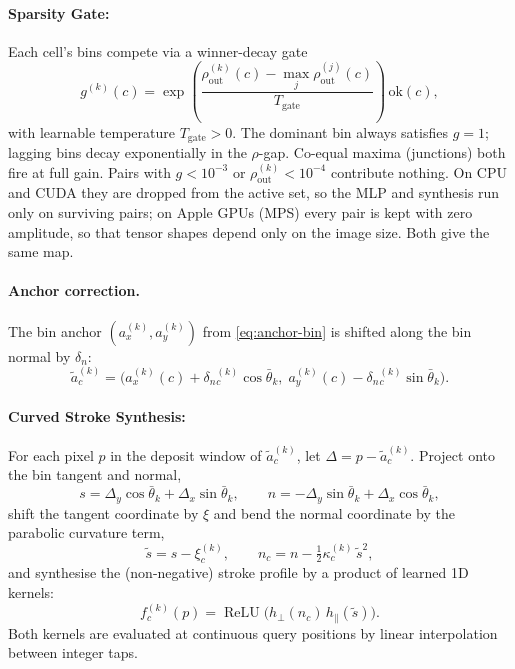 \documentclass[11pt,a4paper]{article}
\newcommand{\relu}{\operatorname{ReLU}}
\begin{document}
\paragraph{Sparsity Gate:}
Each cell's bins compete via a winner-decay gate
\begin{equation}\label{eq:gate}
  g^{(k)}(c) = \exp\!\left(\frac{\rho_{\mathrm{out}}^{(k)}(c) - \max_j \rho_{\mathrm{out}}^{(j)}(c)}{T_{\mathrm{gate}}}\right)\, \mathrm{ok}(c),
\end{equation}
with learnable temperature $T_{\mathrm{gate}} > 0$. The dominant bin always satisfies $g = 1$; lagging bins decay exponentially in the $\rho$-gap. Co-equal maxima (junctions) both fire at full gain. Pairs with $g < 10^{-3}$ or $\rho_{\mathrm{out}}^{(k)} < 10^{-4}$ contribute nothing. On CPU and CUDA they are dropped from the active set, so the MLP and synthesis run only on surviving pairs; on Apple GPUs (MPS) every pair is kept with zero amplitude, so that tensor shapes depend only on the image size. Both give the same map.

\paragraph{Anchor correction.}
The bin anchor $(a_x^{(k)}, a_y^{(k)})$ from \cref{eq:anchor-bin} is shifted along the bin normal by $\delta_n$:
\begin{equation}\label{eq:anchor-shift}
  \tilde a^{(k)}_c = \bigl(a_x^{(k)}(c) + \delta_{n}{}^{(k)}_c \cos\bar\theta_k,\;
                            a_y^{(k)}(c) - \delta_{n}{}^{(k)}_c \sin\bar\theta_k\bigr).
\end{equation}

\paragraph{Curved Stroke Synthesis:}
For each pixel $p$ in the deposit window of $\tilde a^{(k)}_c$, let $\Delta = p - \tilde a^{(k)}_c$. Project onto the bin tangent and normal,
\begin{equation}\label{eq:proj}
  s = \Delta_y \cos\bar\theta_k + \Delta_x \sin\bar\theta_k,
  \qquad
  n = -\Delta_y \sin\bar\theta_k + \Delta_x \cos\bar\theta_k,
\end{equation}
shift the tangent coordinate by $\xi$ and bend the normal coordinate by the parabolic curvature term,
\begin{equation}\label{eq:bend}
  \tilde s = s - \xi^{(k)}_c, \qquad n_c = n - \tfrac{1}{2}\kappa^{(k)}_c\, \tilde s^{2},
\end{equation}
and synthesise the (non-negative) stroke profile by a product of learned 1D kernels:
\begin{equation}\label{eq:f}
  f^{(k)}_c(p) = \relu\!\bigl(h_{\perp}(n_c)\, h_{\parallel}(\tilde s)\bigr).
\end{equation}
Both kernels are evaluated at continuous query positions by linear interpolation between integer taps.
\end{document}
